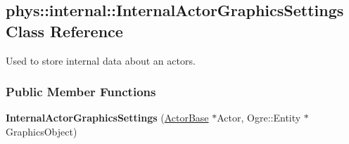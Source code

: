 \hypertarget{classphys_1_1internal_1_1InternalActorGraphicsSettings}{
\subsection{phys::internal::InternalActorGraphicsSettings Class Reference}
\label{d6/d6f/classphys_1_1internal_1_1InternalActorGraphicsSettings}
}


Used to store internal data about an actors.  


\subsubsection*{Public Member Functions}
\begin{DoxyCompactItemize}
\item 
\hypertarget{classphys_1_1internal_1_1InternalActorGraphicsSettings_ab82ae94be294dd4dce58469b8f2f4f14}{
{\bfseries InternalActorGraphicsSettings} (\hyperlink{classphys_1_1ActorBase}{ActorBase} $\ast$Actor, Ogre::Entity $\ast$GraphicsObject)}
\label{d6/d6f/classphys_1_1internal_1_1InternalActorGraphicsSettings_ab82ae94be294dd4dce58469b8f2f4f14}

\end{DoxyCompactItemize}
